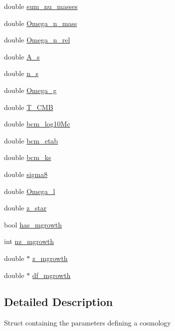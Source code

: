 \begin{DoxyCompactItemize}
\item 
double \mbox{\hyperlink{structccl__parameters_aac77d1ee31cd42cd284a582e0cb1db0a}{sum\+\_\+nu\+\_\+masses}}
\item 
double \mbox{\hyperlink{structccl__parameters_af0f1d0f60ab271f9837a71d84bd55c1e}{Omega\+\_\+n\+\_\+mass}}
\item 
double \mbox{\hyperlink{structccl__parameters_ac04eef0f1888df60a0b49dbbc16ee6f3}{Omega\+\_\+n\+\_\+rel}}
\item 
double \mbox{\hyperlink{structccl__parameters_a315b41a853e710ee2cb280f35e65c191}{A\+\_\+s}}
\item 
double \mbox{\hyperlink{structccl__parameters_a976b7ac7ec53a3edfe38e578e183d51d}{n\+\_\+s}}
\item 
double \mbox{\hyperlink{structccl__parameters_a5ab0e3927b1f95e3f3e22fda29e61c31}{Omega\+\_\+g}}
\item 
double \mbox{\hyperlink{structccl__parameters_a3015eb317a0a8fe96512b2c58b7a5965}{T\+\_\+\+C\+MB}}
\item 
double \mbox{\hyperlink{structccl__parameters_a8293dacd3ac0113c081148cf3023c8cc}{bcm\+\_\+log10\+Mc}}
\item 
double \mbox{\hyperlink{structccl__parameters_a145ed3aeb57e69e949c5c8949caa5464}{bcm\+\_\+etab}}
\item 
double \mbox{\hyperlink{structccl__parameters_a7f0aa19c59970b1d51cd14ea5aa9e5c0}{bcm\+\_\+ks}}
\item 
double \mbox{\hyperlink{structccl__parameters_a4d439ea97dad5c5e651fa8943b074fbd}{sigma8}}
\item 
double \mbox{\hyperlink{structccl__parameters_a674308443d7bafd7373e08bad4e274b9}{Omega\+\_\+l}}
\item 
double \mbox{\hyperlink{structccl__parameters_a9d8e2f05bbb7d49baa63171c4fc5ec4d}{z\+\_\+star}}
\item 
bool \mbox{\hyperlink{structccl__parameters_a95772e3679983bd0ad6874b2fcd03eb1}{has\+\_\+mgrowth}}
\item 
int \mbox{\hyperlink{structccl__parameters_a6e52ddfdb58c6823df3cbd1c7b2208e9}{nz\+\_\+mgrowth}}
\item 
double $\ast$ \mbox{\hyperlink{structccl__parameters_a32c039c86113132e1a7c7a1d2a109ba2}{z\+\_\+mgrowth}}
\item 
double $\ast$ \mbox{\hyperlink{structccl__parameters_a1de918f0be839a643cc8283933f1ffe5}{df\+\_\+mgrowth}}
\end{DoxyCompactItemize}


\subsection{Detailed Description}
Struct containing the parameters defining a cosmology 

